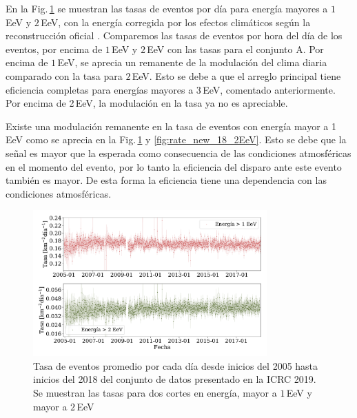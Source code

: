    En la Fig.\,\ref{fig:rate_new_18} se muestran las tasas de eventos por día para energía mayores a $1\,$EeV y $2\,$EeV, con la energía corregida por los efectos climáticos según la reconstrucción oficial \cite{data}.  Comparemos las tasas de eventos por hora del día de los eventos, por encima de $1\,$EeV y $2\,$EeV con las tasas para el conjunto  A. Por encima de $1\,$EeV, se aprecia un remanente de la modulación del clima diaria comparado con la tasa para $2\,$EeV. Esto se debe a que el arreglo principal tiene eficiencia completas para energías mayores a $3\,$EeV, comentado anteriormente. Por encima de 2\,EeV, la modulación en la tasa ya no es apreciable. 


   Existe una modulación remanente en la tasa de eventos con energía mayor a 1 EeV como se aprecia en la Fig.\,\ref{fig:rate_new_18} y \ref{fig:rate_new_18_2EeV}. Esto se debe que la señal es mayor que la esperada como consecuencia de las condiciones atmosféricas en el momento del evento, por lo tanto la eficiencia del disparo ante este evento también es mayor. De esta forma la eficiencia tiene una dependencia con las condiciones atmosféricas.
   \begin{figure}[H]
       \centering
      \includegraphics[width=0.8\textwidth]{Graphs/rate_dayly/herald_above_1EeV_2EeV_rate_day.pdf}
       \caption{Tasa de eventos promedio por cada día desde inicios del 2005 hasta inicios del 2018 del conjunto de datos presentado en la ICRC 2019. Se muestran las tasas para dos cortes en energía, mayor a $1\,$EeV y mayor a $2\,$EeV}\label{fig:rate_new_18}
   \end{figure}



